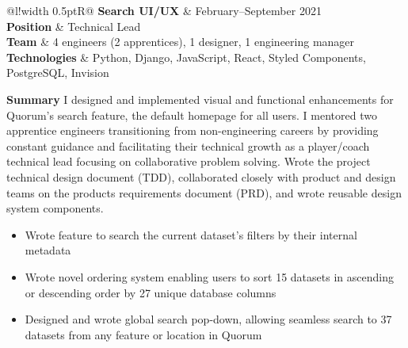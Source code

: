 \documentclass[]{article}
\newcommand\VRule{\color{lightgray}\vrule width 0.5pt}
\begin{document}

\begin{tabular}{@{}l!{\VRule}R@{}}
	{\bf Search UI/UX} & {\footnotesize February--September 2021}\\
	\textbf{Position} & Technical Lead\\
	\textbf{Team} & 4 engineers (2 apprentices), 1 designer, 1 engineering manager\\
	\textbf{Technologies} & Python, Django, JavaScript, React, Styled Components, PostgreSQL, Invision\\
\end{tabular}

\textbf{Summary}
I designed and implemented visual and functional enhancements for Quorum’s search feature, the default homepage for all users. I mentored two apprentice engineers transitioning from non-engineering careers by providing constant guidance and facilitating their technical growth as a player/coach technical lead focusing on collaborative problem solving. Wrote the project technical design document (TDD), collaborated closely with product and design teams on the products requirements document (PRD), and wrote reusable design system components.
\begin{itemize}
    \item Wrote feature to search the current dataset's filters by their internal metadata  %
    \item Wrote novel ordering system enabling users to sort 15 datasets in ascending or descending order by 27 unique database columns
    \item Designed and wrote global search pop-down, allowing seamless search to 37 datasets from any feature or location in Quorum\\
\end{itemize}

\end{document}
